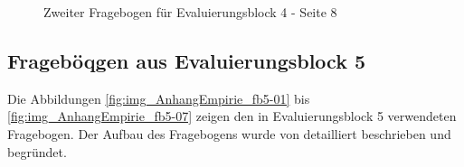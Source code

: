 \begin{figure}[htbp]
	\centering
	\caption{Zweiter Fragebogen für Evaluierungsblock 4 - Seite 8}
	\label{fig:img_AnhangEmpirie_fb4_2-08}
\end{figure}

\clearpage
\subsection{Frageböqgen aus Evaluierungsblock 5}
\label{sub:fb_eval5}

Die Abbildungen \ref{fig:img_AnhangEmpirie_fb5-01} bis \ref{fig:img_AnhangEmpirie_fb5-07} zeigen den in Evaluierungsblock 5 verwendeten Fragebogen. Der Aufbau des Fragebogens wurde von \citet{Bindreiter10} detailliert beschrieben und begründet.

